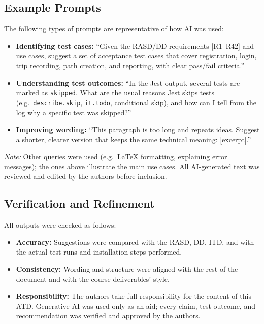 \subsection{Example Prompts}
The following types of prompts are representative of how AI was used:
\begin{itemize}
    \item \textbf{Identifying test cases:} ``Given the RASD/DD requirements [R1--R42] and use cases, suggest a set of acceptance test cases that cover registration, login, trip recording, path creation, and reporting, with clear pass/fail criteria.''
    \item \textbf{Understanding test outcomes:} ``In the Jest output, several tests are marked as \texttt{skipped}. What are the usual reasons Jest skips tests (e.g.\ \texttt{describe.skip}, \texttt{it.todo}, conditional skip), and how can I tell from the log why a specific test was skipped?''
    \item \textbf{Improving wording:} ``This paragraph is too long and repeats ideas. Suggest a shorter, clearer version that keeps the same technical meaning: [excerpt].''
\end{itemize}

\noindent\textit{Note:} Other queries were used (e.g.\ LaTeX formatting, explaining error messages); the ones above illustrate the main use cases. All AI-generated text was reviewed and edited by the authors before inclusion.

\subsection{Verification and Refinement}
All outputs were checked as follows:
\begin{itemize}
    \item \textbf{Accuracy:} Suggestions were compared with the RASD, DD, ITD, and with the actual test runs and installation steps performed.
    \item \textbf{Consistency:} Wording and structure were aligned with the rest of the document and with the course deliverables' style.
    \item \textbf{Responsibility:} The authors take full responsibility for the content of this ATD. Generative AI was used only as an aid; every claim, test outcome, and recommendation was verified and approved by the authors.
\end{itemize}
